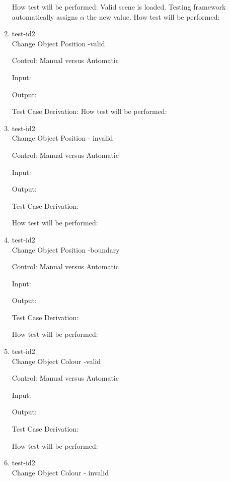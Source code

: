 \documentclass[12pt, titlepage]{article}
\begin{document}
\begin{enumerate}
	How test will be performed: Valid scene is loaded. Testing framework 
	automatically assigns $\alpha$ the new value.
	How test will be performed: 

	\item{test-id2\\}Change Object Position -valid
	
	Control: Manual versus Automatic
	
	Input: 
	
	Output: 
	
	Test Case Derivation: 
	How test will be performed: 
	
		\item{test-id2\\}Change Object Position - invalid
		
		Control: Manual versus Automatic
		
		Input: 
		
		Output: 
		
		Test Case Derivation: 
		
		How test will be performed: 
	\item{test-id2\\}Change Object Position -boundary
	
	Control: Manual versus Automatic
	
	Input: 
	
	Output: 
	
	Test Case Derivation: 
	
	How test will be performed: 
	
	\item{test-id2\\}Change Object Colour -valid
	
	Control: Manual versus Automatic
	
	Input: 
	
	Output: 
	
	Test Case Derivation: 
	
	How test will be performed: 

	\item{test-id2\\}Change Object Colour - invalid
	

\end{enumerate}
\end{document}
